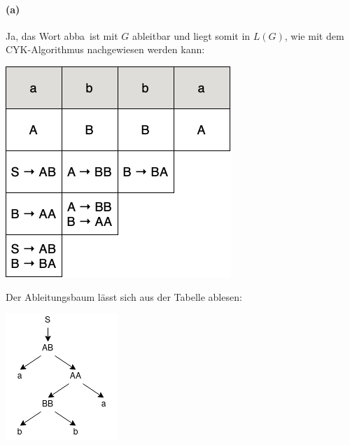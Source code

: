 
\paragraph{(a)}
	Ja, das Wort \glqq abba\grqq\ ist mit $G$ ableitbar und liegt somit in $L(G)$, wie mit dem CYK-Algorithmus nachgewiesen werden kann:
	
	\begin{center}
		\includegraphics[scale=0.45]{CYK-Pyramide.png}
	\end{center}
	
	Der Ableitungsbaum lässt sich aus der Tabelle ablesen:
	
	\begin{center}
		\includegraphics[scale=0.7]{Ableitungsbaum.png}
	\end{center}
		
